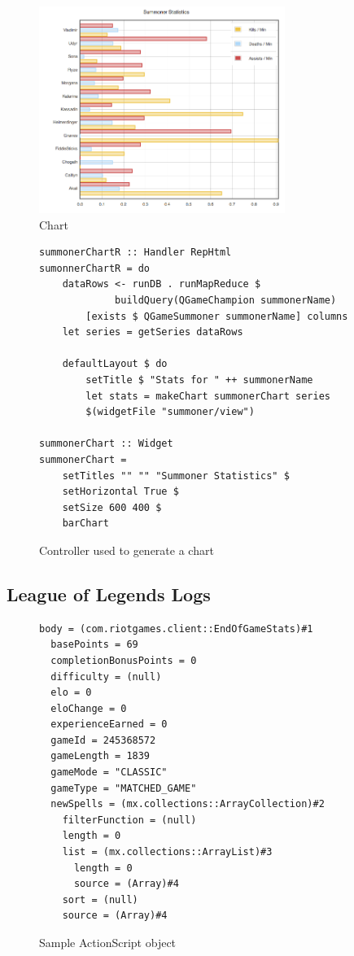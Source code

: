 \documentclass[letterpaper,twocolumn,9pt]{article}
\begin{document}
\begin{figure}[h]
    \includegraphics[width=80mm]{imgs/chart.png}
    \caption{Chart}
    \label{chart}
\end{figure}


\begin{figure}[]
\footnotesize{
\begin{verbatim}
summonerChartR :: Handler RepHtml
sumonnerChartR = do
    dataRows <- runDB . runMapReduce $
             buildQuery(QGameChampion summonerName)
        [exists $ QGameSummoner summonerName] columns
    let series = getSeries dataRows

    defaultLayout $ do
        setTitle $ "Stats for " ++ summonerName
        let stats = makeChart summonerChart series
        $(widgetFile "summoner/view")

summonerChart :: Widget
summonerChart =
    setTitles "" "" "Summoner Statistics" $
    setHorizontal True $
    setSize 600 400 $
    barChart
\end{verbatim}
}
    \caption{Controller used to generate a chart}
    \label{chartcode}
\end{figure}

\subsection{League of Legends Logs}

\begin{figure}[btp]
\footnotesize{
\begin{verbatim}
body = (com.riotgames.client::EndOfGameStats)#1
  basePoints = 69
  completionBonusPoints = 0
  difficulty = (null)
  elo = 0
  eloChange = 0
  experienceEarned = 0
  gameId = 245368572
  gameLength = 1839
  gameMode = "CLASSIC"
  gameType = "MATCHED_GAME"
  newSpells = (mx.collections::ArrayCollection)#2
    filterFunction = (null)
    length = 0
    list = (mx.collections::ArrayList)#3
      length = 0
      source = (Array)#4
    sort = (null)
    source = (Array)#4
\end{verbatim}
}
    \caption{Sample ActionScript object}
    \label{samplelog}
\end{figure}
\end{document}
